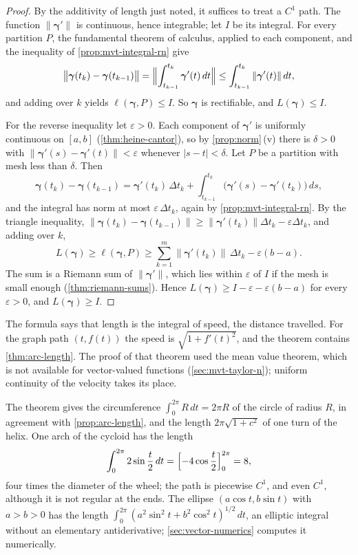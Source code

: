 \begin{proof}
By the additivity of length just noted, it suffices to treat a $C^1$ path. The function $\|\boldsymbol\gamma'\|$ is continuous, hence integrable; let $I$ be its integral. For every partition $P$, the fundamental theorem of calculus, applied to each component, and the inequality of \cref{prop:mvt-integral-rn} give
\[
\bigl\|\boldsymbol\gamma(t_k)-\boldsymbol\gamma(t_{k-1})\bigr\|=\Bigl\|\int_{t_{k-1}}^{t_k}\boldsymbol\gamma'(t)\,dt\Bigr\|\le\int_{t_{k-1}}^{t_k}\|\boldsymbol\gamma'(t)\|\,dt ,
\]
and adding over $k$ yields $\ell(\boldsymbol\gamma,P)\le I$. So $\boldsymbol\gamma$ is rectifiable, and $L(\boldsymbol\gamma)\le I$.

For the reverse inequality let $\varepsilon>0$. Each component of $\boldsymbol\gamma'$ is uniformly continuous on $[a,b]$ (\cref{thm:heine-cantor}), so by \cref{prop:norm}\,(v) there is $\delta>0$ with $\|\boldsymbol\gamma'(s)-\boldsymbol\gamma'(t)\|<\varepsilon$ whenever $|s-t|<\delta$. Let $P$ be a partition with mesh less than $\delta$. Then
\[
\boldsymbol\gamma(t_k)-\boldsymbol\gamma(t_{k-1})=\boldsymbol\gamma'(t_k)\,\Delta t_k+\int_{t_{k-1}}^{t_k}\bigl(\boldsymbol\gamma'(s)-\boldsymbol\gamma'(t_k)\bigr)\,ds ,
\]
and the integral has norm at most $\varepsilon\,\Delta t_k$, again by \cref{prop:mvt-integral-rn}. By the triangle inequality, $\|\boldsymbol\gamma(t_k)-\boldsymbol\gamma(t_{k-1})\|\ge\|\boldsymbol\gamma'(t_k)\|\Delta t_k-\varepsilon\Delta t_k$, and adding over $k$,
\[
L(\boldsymbol\gamma)\ge\ell(\boldsymbol\gamma,P)\ge\sum_{k=1}^m\|\boldsymbol\gamma'(t_k)\|\,\Delta t_k-\varepsilon(b-a).
\]
The sum is a Riemann sum of $\|\boldsymbol\gamma'\|$, which lies within $\varepsilon$ of $I$ if the mesh is small enough (\cref{thm:riemann-sums}). Hence $L(\boldsymbol\gamma)\ge I-\varepsilon-\varepsilon(b-a)$ for every $\varepsilon>0$, and $L(\boldsymbol\gamma)\ge I$.
\end{proof}

The formula says that length is the integral of speed, the distance travelled. For the graph path $(t,f(t))$ the speed is $\sqrt{1+f'(t)^2}$, and the theorem contains \cref{thm:arc-length}. The proof of that theorem used the mean value theorem, which is not available for vector-valued functions (\cref{sec:mvt-taylor-n}); uniform continuity of the velocity takes its place.

The theorem gives the circumference $\int_0^{2\pi}R\,dt=2\pi R$ of the circle of radius $R$, in agreement with \cref{prop:arc-length}, and the length $2\pi\sqrt{1+c^2}$ of one turn of the helix. One arch of the cycloid has the length
\[
\int_0^{2\pi}2\sin\frac t2\,dt=\Bigl[-4\cos\frac t2\Bigr]_0^{2\pi}=8 ,
\]
four times the diameter of the wheel; the path is piecewise $C^1$, and even $C^1$, although it is not regular at the ends. The ellipse $(a\cos t,b\sin t)$ with $a>b>0$ has the length $\int_0^{2\pi}(a^2\sin^2t+b^2\cos^2t)^{1/2}\,dt$, an elliptic integral without an elementary antiderivative; \cref{sec:vector-numerics} computes it numerically.

